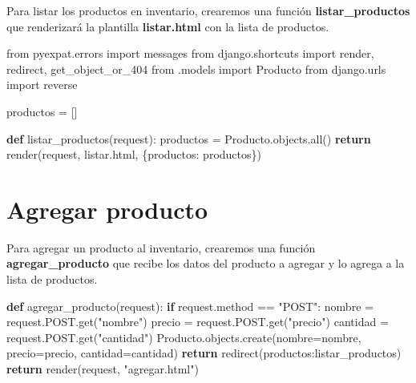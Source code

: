 \documentclass[
  a4paper,
  DIV=11,
  numbers=noendperiod,
  onepage,
  openany]{scrreprt}
\newenvironment{Shaded}{\begin{snugshade}}{\end{snugshade}}
\newcommand{\BuiltInTok}[1]{\textcolor[rgb]{0.00,0.23,0.31}{#1}}
\newcommand{\ControlFlowTok}[1]{\textcolor[rgb]{0.00,0.23,0.31}{\textbf{#1}}}
\newcommand{\ImportTok}[1]{\textcolor[rgb]{0.00,0.46,0.62}{#1}}
\newcommand{\KeywordTok}[1]{\textcolor[rgb]{0.00,0.23,0.31}{\textbf{#1}}}
\newcommand{\NormalTok}[1]{\textcolor[rgb]{0.00,0.23,0.31}{#1}}
\newcommand{\OperatorTok}[1]{\textcolor[rgb]{0.37,0.37,0.37}{#1}}
\newcommand{\StringTok}[1]{\textcolor[rgb]{0.13,0.47,0.30}{#1}}
\begin{document}
\begin{tcolorbox}
Para listar los productos en inventario, crearemos una función
\textbf{listar\_productos} que renderizará la plantilla
\textbf{listar.html} con la lista de productos.

\begin{Shaded}
\begin{Highlighting}[]
\ImportTok{from}\NormalTok{ pyexpat.errors }\ImportTok{import}\NormalTok{ messages}
\ImportTok{from}\NormalTok{ django.shortcuts }\ImportTok{import}\NormalTok{ render, redirect, get\_object\_or\_404}
\ImportTok{from}\NormalTok{ .models }\ImportTok{import}\NormalTok{ Producto}
\ImportTok{from}\NormalTok{ django.urls }\ImportTok{import}\NormalTok{ reverse }

\NormalTok{productos }\OperatorTok{=}\NormalTok{ []}

\KeywordTok{def}\NormalTok{ listar\_productos(request):}
\NormalTok{    productos }\OperatorTok{=}\NormalTok{ Producto.objects.}\BuiltInTok{all}\NormalTok{()}
    \ControlFlowTok{return}\NormalTok{ render(request, }\StringTok{\textquotesingle{}listar.html\textquotesingle{}}\NormalTok{, \{}\StringTok{\textquotesingle{}productos\textquotesingle{}}\NormalTok{: productos\})}
\end{Highlighting}
\end{Shaded}

\section{Agregar producto}\label{agregar-producto}

Para agregar un producto al inventario, crearemos una función
\textbf{agregar\_producto} que recibe los datos del producto a agregar y
lo agrega a la lista de productos.

\begin{Shaded}
\begin{Highlighting}[]
\KeywordTok{def}\NormalTok{ agregar\_producto(request):}
    \ControlFlowTok{if}\NormalTok{ request.method }\OperatorTok{==} \StringTok{"POST"}\NormalTok{:}
\NormalTok{        nombre }\OperatorTok{=}\NormalTok{ request.POST.get(}\StringTok{"nombre"}\NormalTok{)}
\NormalTok{        precio }\OperatorTok{=}\NormalTok{ request.POST.get(}\StringTok{"precio"}\NormalTok{)}
\NormalTok{        cantidad }\OperatorTok{=}\NormalTok{ request.POST.get(}\StringTok{"cantidad"}\NormalTok{)}
\NormalTok{        Producto.objects.create(nombre}\OperatorTok{=}\NormalTok{nombre, precio}\OperatorTok{=}\NormalTok{precio, cantidad}\OperatorTok{=}\NormalTok{cantidad) }
        \ControlFlowTok{return}\NormalTok{ redirect(}\StringTok{\textquotesingle{}productos:listar\_productos\textquotesingle{}}\NormalTok{)}
    \ControlFlowTok{return}\NormalTok{ render(request, }\StringTok{"agregar.html"}\NormalTok{)}
\end{Highlighting}
\end{Shaded}


\end{tcolorbox}
\end{document}

